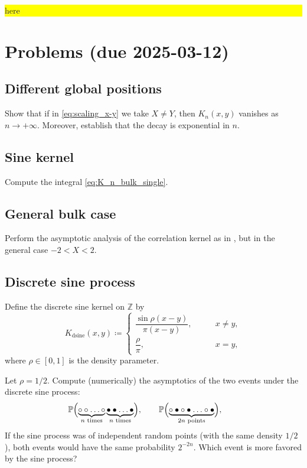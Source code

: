 \documentclass[letterpaper,11pt,oneside,reqno]{article}
\numberwithin{equation}{section}
\theoremstyle{definition}
\begin{document}
\colorbox{yellow}{\parbox{.7\textwidth}{here}}




\appendix
\setcounter{section}{5}

\section{Problems (due 2025-03-12)}

\subsection{Different global positions}
\label{prob:different-global-positions}

Show that if in \eqref{eq:scaling_x-y} we take $X\ne Y$, then
$K_n(x,y)$ vanishes as $n\to+\infty$. Moreover,
establish that the decay is exponential in $n$.

\subsection{Sine kernel}
\label{prob:sine-kernel}

Compute the integral
\eqref{eq:K_n_bulk_single}.

\subsection{General bulk case}
\label{prob:imaginary-critical-points}

Perform the asymptotic analysis of the correlation
kernel as in ,
but in the general case $-2<X<2$.

\subsection{Discrete sine process}
\label{prob:discrete-sine-process}

Define the discrete sine kernel on $\mathbb{Z}$ by
\begin{equation*}
	K_{\mathrm{dsine}}(x,y)\coloneqq
	\begin{cases}
		\dfrac{\sin \rho(x-y)}{\pi (x-y)},&\qquad x\ne y,\\[10pt]
		\dfrac{\rho}{\pi},&\qquad x=y,
	\end{cases}
\end{equation*}
where $\rho\in[0,1]$ is the density parameter.

Let $\rho=1/2$.
Compute (numerically) the asymptotics of the two events under the discrete sine process:
\begin{equation*}
	\operatorname{\mathbb{P}}
	\Bigl(
		\underbrace{\circ \circ\ldots\circ}_{n\text{ times}}
		\underbrace{\bullet \bullet\ldots\bullet}_{n\text{ times}}
	\Bigr),\qquad
	\operatorname{\mathbb{P}}
	\Bigl(
		\underbrace{\circ\bullet\circ\bullet\ldots\circ\bullet}_{2n\text{ points}}
	\Bigr),\qquad
\end{equation*}
If the sine process was of independent random points (with the same density $1/2$),
both events
would have the same probability $2^{-2n}$.
Which event is more favored by the sine process?
\end{document}
